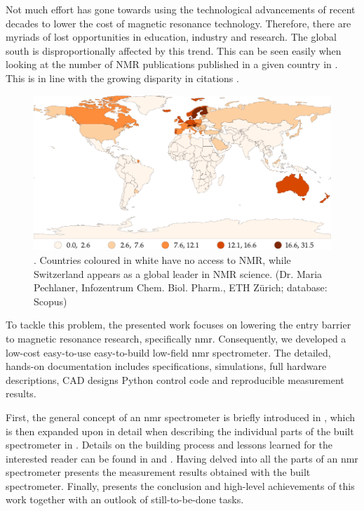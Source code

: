 Not much effort has gone towards using the technological advancements of recent decades to lower the cost of magnetic resonance technology. Therefore, there are myriads of lost opportunities in education, industry and research. The global south is disproportionally affected by this trend. This can be seen easily when looking at the number of NMR publications published in a given country in . This is in line with the growing disparity in citations .
\begin{figure}[h!bt]
    \centering
    \includegraphics{data/nmr_citations/nmr-affiliations-per-million-people_naturalbreaks.pdf}
    \caption{. Countries coloured in white have no access to NMR, while Switzerland appears as a global leader in NMR science. (Dr. Maria Pechlaner, Infozentrum Chem. Biol. Pharm., ETH Zürich; database: Scopus)}
\end{figure}

To tackle this problem, the presented work focuses on lowering the entry barrier to magnetic resonance research, specifically \acrfull{nmr}. Consequently, we developed a low-cost easy-to-use easy-to-build low-field \acrshort{nmr} spectrometer. The detailed, hands-on documentation includes specifications, simulations, full hardware descriptions, CAD designs Python control code and reproducible measurement results.

First, the general concept of an \acrshort{nmr} spectrometer is briefly introduced in , which is then expanded upon in detail when describing the individual parts of the built spectrometer in . Details on the building process and lessons learned for the interested reader can be found in  and . Having delved into all the parts of an \acrshort{nmr} spectrometer  presents the measurement results obtained with the built spectrometer. Finally,  presents the conclusion and high-level achievements of this work together with an outlook of still-to-be-done tasks.
